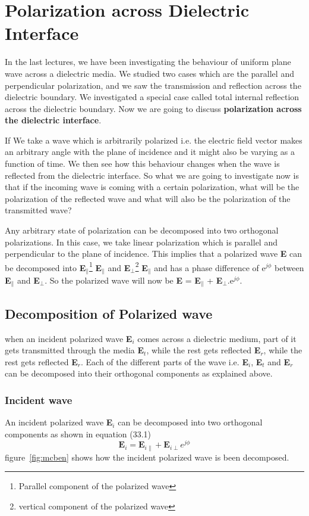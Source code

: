 \chapter{Polarization across Dielectric Interface}
In the last lectures, we have been investigating the behaviour of uniform plane wave across a dielectric media. We studied two cases which are the parallel and perpendicular polarization, and we saw the transmission and reflection across the dielectric boundary. We investigated a special case called total internal reflection across the dielectric boundary. Now we are going to discuss \textbf{polarization across the dielectric interface}. 

If We take a wave which is arbitrarily polarized i.e. the electric field vector makes an arbitrary angle with the plane of incidence and it might also be varying as a function of time. We then see how this behaviour changes when the wave is reflected from the dielectric interface. So what we are going to investigate now is that if the incoming wave is coming with a certain polarization, what will be the polarization of the reflected wave and what will also be the polarization of the transmitted wave?

Any arbitrary state of polarization can be decomposed into two orthogonal polarizations. In this case, we take linear polarization which is parallel and perpendicular to the plane of incidence. This implies that a polarized wave \textbf{E} can be decomposed into \textbf{E}$_\parallel$\footnote{Parallel component of the polarized wave} \textbf{E}$_\parallel$ and \textbf{E}$_\perp$\footnote{vertical component of the polarized wave} \textbf{E}$_\parallel$ and has a phase difference of e$^{j\phi}$ between \textbf{E}$_\parallel$ and \textbf{E}$_\perp$. So the polarized wave will now be \textbf{E} = \textbf{E}$_\parallel$ + \textbf{E}$_\perp$.e$^{j\phi}$.	
\section{Decomposition of Polarized wave}	
when an incident polarized wave \textbf{E$_i$} comes across a dielectric medium, part of it gets transmitted through the media \textbf{E$_t$}, while the rest gets reflected \textbf{E$_r$}, while the rest gets reflected \textbf{E$_r$}. Each of the different parts of the wave i.e. \textbf{E$_i$}, \textbf{E$_t$} and \textbf{E$_r$} can be decomposed into their orthogonal components as explained above.	
\subsection{Incident wave}	
An incident polarized wave \textbf{E$_i$} can be decomposed into two orthogonal components as shown in equation (33.1)	
\begin{equation}
\textbf{E}_i = \textbf{E}_{i\parallel} + \textbf{E}_{i\perp} e^{j\phi}
\end{equation}
figure~\ref{fig:mcben} shows how the incident polarized wave is been decomposed.	
